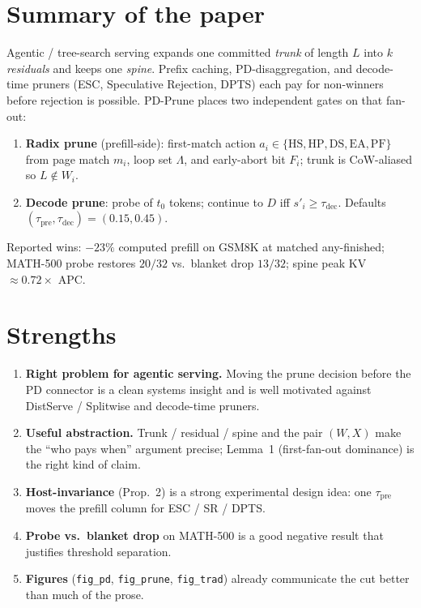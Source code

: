 \documentclass[11pt]{article}
\newcommand{\sys}{\textsf{PD-Prune}\xspace}
\newcommand{\Work}{W}
\newcommand{\Xfer}{X}
\begin{document}
\section{Summary of the paper}
Agentic / tree-search serving expands one committed \emph{trunk} of length $L$
into $k$ \emph{residuals} and keeps one \emph{spine}. Prefix caching,
PD-disaggregation, and decode-time pruners (ESC, Speculative Rejection, DPTS)
each pay for non-winners before rejection is possible.
\sys places two independent gates on that fan-out:
\begin{enumerate}[label=(\alph*)]
  \item \textbf{Radix prune} (prefill-side): first-match action
        $a_i\in\{\mathrm{HS},\mathrm{HP},\mathrm{DS},\mathrm{EA},\mathrm{PF}\}$
        from page match $m_i$, loop set $\Lambda$, and early-abort bit $F_i$;
        trunk is CoW-aliased so $L\notin\Work_i$.
  \item \textbf{Decode prune}: probe of $t_0$ tokens; continue to $D$ iff
        $s'_i\ge\tau_{\mathrm{dec}}$. Defaults $(\tau_{\mathrm{pre}},\tau_{\mathrm{dec}})=(0.15,0.45)$.
\end{enumerate}
Reported wins: $-23\%$ computed prefill on GSM8K at matched any-finished;
MATH-500 probe restores $20/32$ vs.\ blanket drop $13/32$; spine peak KV
$\approx 0.72\times$ APC.

\section{Strengths}
\begin{enumerate}
  \item \textbf{Right problem for agentic serving.} Moving the prune decision
        before the PD connector is a clean systems insight and is well
        motivated against DistServe / Splitwise and decode-time pruners.
  \item \textbf{Useful abstraction.} Trunk / residual / spine and the pair
        $(\Work,\Xfer)$ make the ``who pays when'' argument precise; Lemma~1
        (first-fan-out dominance) is the right kind of claim.
  \item \textbf{Host-invariance} (Prop.~2) is a strong experimental design
        idea: one $\tau_{\mathrm{pre}}$ moves the prefill column for ESC / SR / DPTS.
  \item \textbf{Probe vs.\ blanket drop} on MATH-500 is a good negative result
        that justifies threshold separation.
  \item \textbf{Figures} (\texttt{fig\_pd}, \texttt{fig\_prune}, \texttt{fig\_trad})
        already communicate the cut better than much of the prose.
\end{enumerate}
\end{document}
